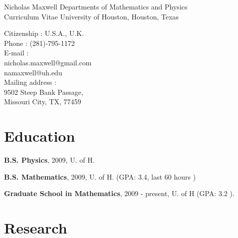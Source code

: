 \documentclass[letterpaper]{article}
\begin{document}
\vspace{0.25in}

\begin{flushleft}
Nicholas Maxwell \hfill Departments of Mathematics and Physics \\
Curriculum Vitae \hfill  University of Houston, Houston, Texas \\
\hrulefill
\end{flushleft}

\begin{flushleft}
Citizenship : U.S.A., U.K.\\
Phone : (281)-795-1172\\
E-mail : \\
\hspace{0.25in} nicholas.maxwell@gmail.com\\
\hspace{0.25in} namaxwell@uh.edu\\
Mailing address : \\
\hspace{0.25in} 9502 Steep Bank Passage,\\
\hspace{0.25in} Missouri City, TX, 77459
\end{flushleft}

\section*{Education}

\begin{flushleft}
\hspace{0.25in} {\bf B.S. Physics}, 2009, U. of H.\\
\end{flushleft}
\begin{flushleft}
\hspace{0.25in} {\bf B.S. Mathematics}, 2009, U. of H. (GPA: 3.4, last 60 hours )
\end{flushleft}
\begin{flushleft}
\hspace{0.25in} {\bf Graduate School in Mathematics}, 2009 - present, U. of H  (GPA: 3.2 ).
\end{flushleft}

\section*{Research}
\end{document}
